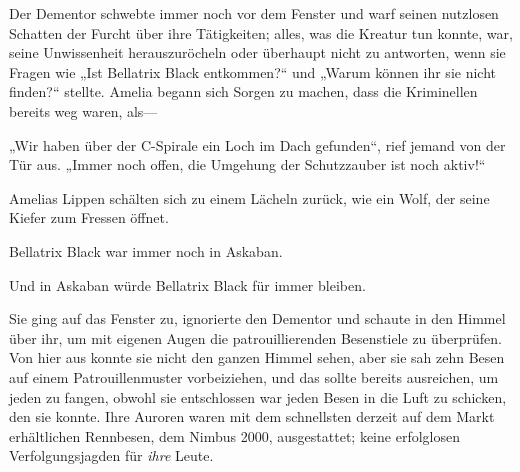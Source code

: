 Der Dementor schwebte immer noch vor dem Fenster und warf seinen nutzlosen Schatten der Furcht über ihre Tätigkeiten; alles, was die Kreatur tun konnte, war, seine Unwissenheit herauszuröcheln oder überhaupt nicht zu antworten, wenn sie Fragen wie
„Ist Bellatrix Black entkommen?“ und
„Warum können ihr sie nicht finden?“ stellte. Amelia begann sich Sorgen zu machen, dass die Kriminellen bereits weg waren, als—

„Wir haben über der C-Spirale ein Loch im Dach gefunden“, rief jemand von der Tür aus.
„Immer noch offen, die Umgehung der Schutzzauber ist noch aktiv!“

Amelias Lippen schälten sich zu einem Lächeln zurück, wie ein Wolf, der seine Kiefer zum Fressen öffnet.

Bellatrix Black war immer noch in Askaban.

Und in Askaban würde Bellatrix Black für immer bleiben.

Sie ging auf das Fenster zu, ignorierte den Dementor und schaute in den Himmel über ihr, um mit eigenen Augen die patrouillierenden Besenstiele zu überprüfen. Von hier aus konnte sie nicht den ganzen Himmel sehen, aber sie sah zehn Besen auf einem Patrouillenmuster vorbeiziehen, und das sollte bereits ausreichen, um jeden zu fangen, obwohl sie entschlossen war jeden Besen in die Luft zu schicken, den sie konnte. Ihre Auroren waren mit dem schnellsten derzeit auf dem Markt erhältlichen Rennbesen, dem Nimbus 2000, ausgestattet; keine erfolglosen Verfolgungsjagden für \emph{ihre} Leute.

